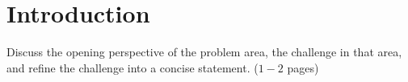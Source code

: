 
\chapter{Introduction}
\label{Chapter1}

Discuss the opening perspective of the problem area, the challenge in that area, and refine the challenge into a concise statement. ($1-2$ pages)